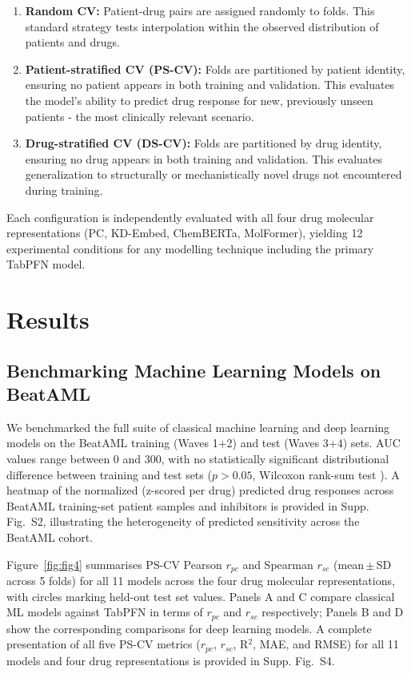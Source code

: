 \documentclass[pdflatex,sn-mathphys-num]{sn-jnl}
\theoremstyle{thmstyleone}
\theoremstyle{thmstyletwo}
\theoremstyle{thmstylethree}
\begin{document}
\begin{enumerate}
    \item \textbf{Random CV:} Patient-drug pairs are assigned randomly to folds. This standard strategy tests interpolation within the observed distribution of patients and drugs.
    \item \textbf{Patient-stratified CV (PS-CV):} Folds are partitioned by patient identity, ensuring no patient appears in both training and validation. This evaluates the model's ability to predict drug response for new, previously unseen patients - the most clinically relevant scenario.
    \item \textbf{Drug-stratified CV (DS-CV):} Folds are partitioned by drug identity, ensuring no drug appears in both training and validation. This evaluates generalization to structurally or mechanistically novel drugs not encountered during training.
\end{enumerate}

Each configuration is independently evaluated with all four drug molecular representations (PC, KD-Embed, ChemBERTa, MolFormer), yielding 12 experimental conditions for any modelling technique including the primary TabPFN model.

\section{Results}\label{sec3}

\subsection{Benchmarking Machine Learning Models on BeatAML}\label{sec3.1}
We benchmarked the full suite of classical machine learning and deep learning models on the BeatAML training (Waves 1+2) and test (Waves 3+4) sets. AUC values range between 0 and 300, with no statistically significant distributional difference between training and test sets ($p > 0.05$, Wilcoxon rank-sum test \cite{mann1947test}). A heatmap of the normalized (z-scored per drug) predicted drug responses across BeatAML training-set patient samples and inhibitors is provided in Supp. Fig.~S2, illustrating the heterogeneity of predicted sensitivity across the BeatAML cohort.

Figure~\ref{fig:fig4} summarises PS-CV Pearson $r_{pc}$ and Spearman $r_{sc}$ (mean\,$\pm$\,SD across 5 folds) for all 11 models across the four drug molecular representations, with circles marking held-out test set values. Panels A and C compare classical ML models against TabPFN in terms of $r_{pc}$ and $r_{sc}$ respectively; Panels B and D show the corresponding comparisons for deep learning models. A complete presentation of all five PS-CV metrics ($r_{pc}$, $r_{sc}$, R$^2$, MAE, and RMSE) for all 11 models and four drug representations is provided in Supp. Fig.~S4.
\end{document}
